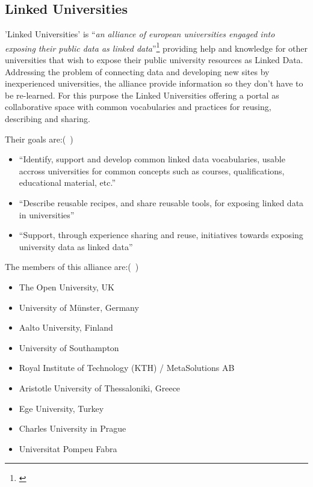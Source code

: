 \documentclass{article}
\begin{document}
\subsection{Linked Universities}
\label{related-work:linked-universities}
'Linked Universities' is "`\textit{an alliance of european universities engaged into exposing their public data as linked data}"'\footnote{\cite{daquin_linked_2014}} providing help and knowledge for other universities that wish to expose their public university resources as Linked Data. Addressing the problem of connecting data and developing new sites by inexperienced universities, the alliance provide information so they don't have to be re-learned. For this purpose the Linked Universities offering a portal as collaborative space with common vocabularies and practices for reusing, describing and sharing. 

Their goals are:(~\cite{daquin_linked_2014})

\begin{itemize}
\item "`Identify, support and develop common linked data vocabularies, usable accross universities for common concepts such as courses, qualifications, educational material, etc."'
\item "`Describe reusable recipes, and share reusable tools, for exposing linked data in universities"'
\item "`Support, through experience sharing and reuse, initiatives towards exposing university data as linked data"'
\end{itemize}

The members of this alliance are:(~\cite{daquin_members_2014})
\begin{itemize}
	\item The Open University, UK
	\item University of Münster, Germany
	\item Aalto University, Finland
	\item University of Southampton
	\item Royal Institute of Technology (KTH) / MetaSolutions AB
	\item Aristotle University of Thessaloniki, Greece
	\item Ege University, Turkey
	\item Charles University in Prague
	\item Universitat Pompeu Fabra
\end{itemize}
\end{document}
